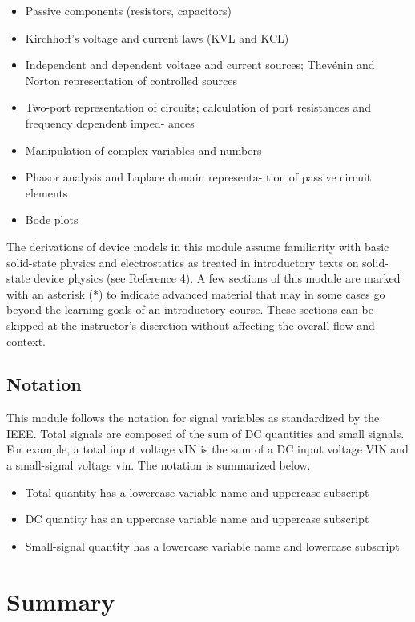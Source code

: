 \documentclass[
  11pt,
  letterpaper,
  abstract]{scrbook}
\begin{document}
\begin{itemize}
\item
  Passive components (resistors, capacitors)
\item
  Kirchhoff's voltage and current laws (KVL and KCL)
\item
  Independent and dependent voltage and current sources; Thevénin and
  Norton representation of controlled sources
\item
  Two-port representation of circuits; calculation of port resistances
  and frequency dependent imped- ances
\item
  Manipulation of complex variables and numbers
\item
  Phasor analysis and Laplace domain representa- tion of passive circuit
  elements
\item
  Bode plots
\end{itemize}

The derivations of device models in this module assume familiarity with
basic solid-state physics and electrostatics as treated in introductory
texts on solid-state device physics (see Reference 4). A few sections of
this module are marked with an asterisk (*) to indicate advanced
material that may in some cases go beyond the learning goals of an
introductory course. These sections can be skipped at the instructor's
discretion without affecting the overall flow and context.

\section{Notation}\label{notation}

This module follows the notation for signal variables as standardized by
the IEEE. Total signals are composed of the sum of DC quantities and
small signals. For example, a total input voltage vIN is the sum of a DC
input voltage VIN and a small-signal voltage vin. The notation is
summarized below.

\begin{itemize}
\item
  Total quantity has a lowercase variable name and uppercase subscript
\item
  DC quantity has an uppercase variable name and uppercase subscript
\item
  Small-signal quantity has a lowercase variable name and lowercase
  subscript
\end{itemize}

\chapter{Summary}\label{summary}
\end{document}
